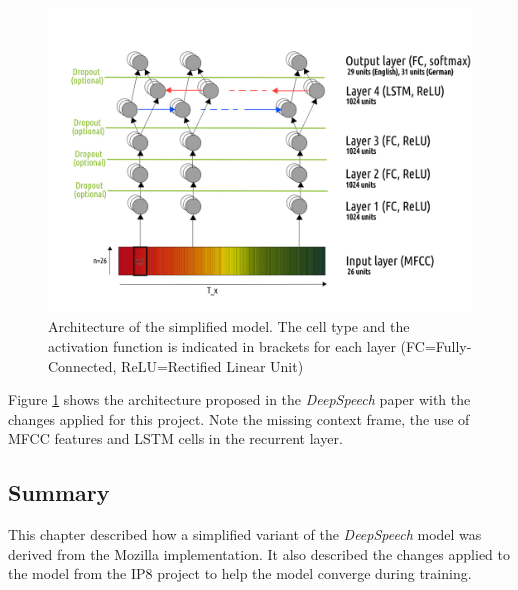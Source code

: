 \begin{figure}[h!]
	\includegraphics[width=\linewidth]{./img/model_architecture.png}
	\caption{Architecture of the simplified model. The cell type and the activation function is indicated in brackets for each layer (FC=Fully-Connected, ReLU=Rectified Linear Unit)}
	\label{model_architecture}
\end{figure}

Figure \ref{model_architecture} shows the architecture proposed in the \textit{DeepSpeech} paper with the changes applied for this project. Note the missing context frame, the use of \ac{MFCC} features and \ac{LSTM} cells in the recurrent layer.

\clearpage
\subsection{Summary}

This chapter described how a simplified variant of the \textit{DeepSpeech} model was derived from the Mozilla implementation. It also described the changes applied to the model from the IP8 project to help the model converge during training.